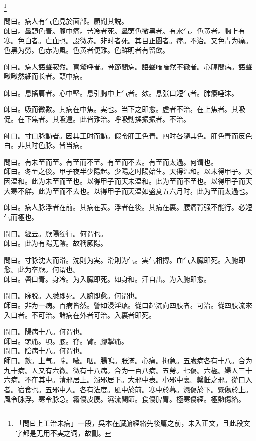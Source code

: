 \documentclass[12pt,twoside,UTF8,b5paper]{ctexbook}
\begin{document}
	\footnote{「問曰上工治未病」一段，吳本在臓腑經絡先後篇之前，未入正文，且此段文字都是无用不実之词，故刪。}

問曰。病人有气色見於面部。願聞其説。\\
師曰。鼻頭色青。腹中痛。苦冷者死。鼻頭色微黑者。有水气。色黄者。胸上有寒。色白者。亡血也。設微赤。非时者死。其目正圓者。痙。不治。又色青为痛。色黑为勞。色赤为風。色黄者便難。色鲜明者有留飲。

師曰。病人語聲寂然。喜驚呼者。骨節間病。語聲喑喑然不徹者。心膈間病。語聲啾啾然細而长者。頭中病。

師曰。息搖肩者。心中堅。息引胸中上气者。欬。息张口短气者。肺痿唾沫。

師曰。吸而微數。其病在中焦。実也。当下之即愈。虗者不治。在上焦者。其吸促。在下焦者。其吸遠。此皆難治。呼吸動搖振振者。不治。

師曰。寸口脉動者。因其王时而動。假令肝王色青。四时各隨其色。肝色青而反色白。非其时色脉。皆当病。

問曰。有未至而至。有至而不至。有至而不去。有至而太過。何谓也。\\
師曰。冬至之後。甲子夜半少陽起。少陽之时陽始生。天得温和。以未得甲子。天因温和。此为未至而至也。以得甲子而天未温和。此为至而不至也。以得甲子而天大寒不觧。此为至而不去也。以得甲子而天温如盛夏五六月时。此为至而太過也。

師曰。病人脉浮者在前。其病在表。浮者在後。其病在裏。腰痛背强不能行。必短气而極也。

問曰。經云。厥陽獨行。何谓也。\\
師曰。此为有陽无陰。故稱厥陽。

問曰。寸脉沈大而滑。沈則为実。滑則为气。実气相摶。血气入臓即死。入腑即愈。此为卒厥。何谓也。\\
師曰。唇口青。身冷。为入臓即死。如身和。汗自出。为入腑即愈。

問曰。脉脱。入臓即死。入腑即愈。何谓也。\\
師曰。非为一病。百病皆然。譬如浸淫瘡。從口起流向四肢者。可治。從四肢流來入口者。不可治。{諸}病在外者可治。入裏者即死。

問曰。陽病十八。何谓也。\\
師曰。頭痛。項。腰。脊。臂。腳掣痛。\\
問曰。陰病十八。何谓也。\\
師曰。欬。上气。喘。噦。咽。腸鳴。胀滿。心痛。拘急。五臓病各有十八。合为九十病。人又有六微。微有十八病。合为一百八病。五勞。七傷。六極。婦人三十六病。不在其中。清邪居上。濁邪居下。大邪中表。小邪中裏。䅽飪之邪。從口入者。宿食也。五邪中人。各有法度。風中於前。寒中於暮。濕傷於下。霧傷於上。風令脉浮。寒令脉急。霧傷皮腠。濕流関節。食傷脾胃。極寒傷經。極熱傷絡。
\end{document}
